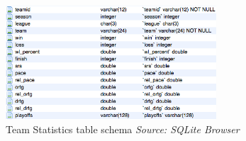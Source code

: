 \begin{figure}[h!]
	\begin{center}
		\includegraphics[width=0.7\textwidth]{./images/teamstats}
		\caption{Team Statistics table schema \textit{Source: SQLite Browser}}
		\label{fig:411-7}
	\end{center}
\end{figure}